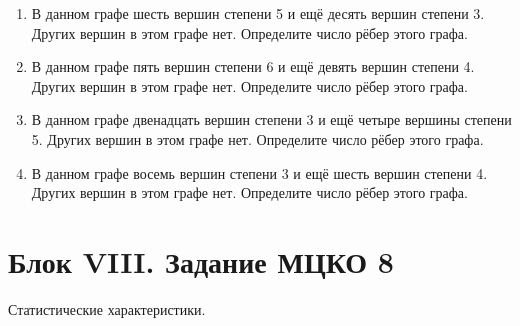 \documentclass[a4paper,12pt]{article}
\newcommand{\taskspace}{\par\vspace{0.42cm}}
\newcommand{\blocknote}[1]{%
  {\color{soft}\small #1\par}\vspace{0.25cm}%
}
\begin{document}
\begin{enumerate}[resume]
\taskspace

\item В данном графе шесть вершин степени 5 и ещё десять вершин степени 3. Других вершин в этом графе нет. Определите число рёбер этого графа.

\taskspace

\item В данном графе пять вершин степени 6 и ещё девять вершин степени 4. Других вершин в этом графе нет. Определите число рёбер этого графа.

\taskspace

\item В данном графе двенадцать вершин степени 3 и ещё четыре вершины степени 5. Других вершин в этом графе нет. Определите число рёбер этого графа.

\taskspace

\item В данном графе восемь вершин степени 3 и ещё шесть вершин степени 4. Других вершин в этом графе нет. Определите число рёбер этого графа.

\taskspace

\end{enumerate}

\newpage

\section*{Блок VIII. Задание МЦКО 8}

\blocknote{Статистические характеристики.}
\end{document}
